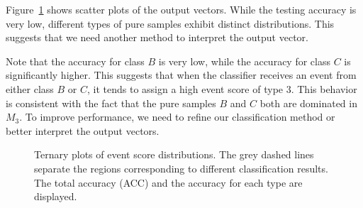 \documentclass[12pt]{article}
\begin{document}
        Figure~\ref{fig:event_score_distribution_ambiguous} shows scatter plots of the output vectors. While the testing accuracy is very low, different types of pure samples exhibit distinct distributions. This suggests that we need another method to interpret the output vector. 

        Note that the accuracy for class $B$ is very low, while the accuracy for class $C$ is significantly higher. This suggests that when the classifier receives an event from either class $B$ or $C$, it tends to assign a high event score of type 3. This behavior is consistent with the fact that the pure samples $B$ and $C$ both are dominated in $M_3$. To improve performance, we need to refine our classification method or better interpret the output vectors.
        \begin{figure}[htpb]
            \centering
            \caption{Ternary plots of event score distributions. The grey dashed lines separate the regions corresponding to different classification results. The total accuracy (ACC) and the accuracy for each type are displayed.}
            \label{fig:event_score_distribution_ambiguous}
        \end{figure} 
\end{document}
